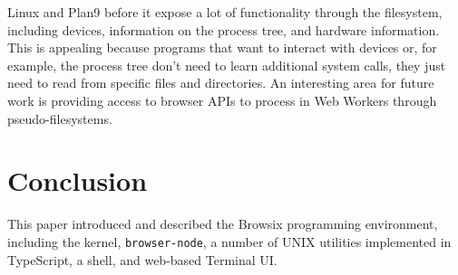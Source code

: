 \documentclass{acm_proc_article-sp}
\begin{document}
Linux and Plan9 before it expose a lot of functionality through the
filesystem, including devices, information on the process tree, and
hardware information.  This is appealing because programs that want to
interact with devices or, for example, the process tree don't need to
learn additional system calls, they just need to read from specific
files and directories.  An interesting area for future work is
providing access to browser APIs to process in Web Workers through
pseudo-filesystems.

\section{Conclusion}

This paper introduced and described the Browsix programming
environment, including the kernel, \texttt{browser-node}, a number of
UNIX utilities implemented in TypeScript, a shell, and web-based
Terminal UI.




\balancecolumns
\end{document}
